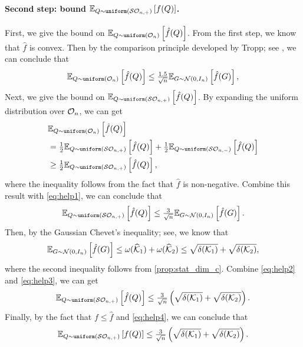 \paragraph{Second step: bound $\mathbb{E}_{Q \sim \operatorname{\texttt{uniform}}(\mathcal{S}\mathcal{O}_{n, +})}\left[f(Q)\right]$.} 
First, we give the bound on $\mathbb{E}_{Q \sim \operatorname{\texttt{uniform}}(\mathcal{O}_n)}\left[\hat f(Q)\right]$. From the first step, we know that $\hat f$ is convex. Then by the comparison principle developed by Tropp; see \cite[Theorem~5 and Lemma~8]{tropp2012comparison}, we can conclude that 
\begin{equation} \label{eq:help1}
  \mathbb{E}_{Q \sim \operatorname{\texttt{uniform}}(\mathcal{O}_n)}\left[\hat f(Q)\right] \leq \tfrac{1.5}{\sqrt{n}}\mathbb{E}_{G\sim\mathcal{N}(0, I_n)}\left[\hat f(G)\right],
\end{equation}
Next, we give the bound on $\mathbb{E}_{Q \sim \operatorname{\texttt{uniform}}(\mathcal{S}\mathcal{O}_{n, +})}\left[\hat f(Q)\right]$. By expanding the uniform distribution over $\mathcal{O}_n$, we can get
\begin{align*}
  &\mathbb{E}_{Q \sim \operatorname{\texttt{uniform}}(\mathcal{O}_n)}\left[\hat f(Q)\right] 
  \\&= \tfrac{1}{2}\mathbb{E}_{Q \sim \operatorname{\texttt{uniform}}(\mathcal{S}\mathcal{O}_{n, +})}\left[\hat f(Q)\right] + \tfrac{1}{2}\mathbb{E}_{Q \sim \operatorname{\texttt{uniform}}(\mathcal{S}\mathcal{O}_{n, -})}\left[\hat f(Q)\right]
  \\&\geq \tfrac{1}{2}\mathbb{E}_{Q \sim \operatorname{\texttt{uniform}}(\mathcal{S}\mathcal{O}_{n, +})}\left[\hat f(Q)\right],
\end{align*}
where the inequality follows from the fact that $\hat f$ is non-negative. Combine this result with \eqref{eq:help1}, we can conclude that 
\begin{equation} \label{eq:help2}
  \mathbb{E}_{Q \sim \operatorname{\texttt{uniform}}(\mathcal{S}\mathcal{O}_{n, +})}\left[\hat f(Q)\right] \leq \tfrac{3}{\sqrt{n}}\mathbb{E}_{G\sim\mathcal{N}(0, I_n)}\left[\hat f(G)\right].
\end{equation}
Then, by the Gaussian Chevet’s inequality; see\cite[Exercise~8.7.4]{vershynin2018high}, we know that 
\begin{equation} \label{eq:help3}
  \mathbb{E}_{G\sim\mathcal{N}(0, I_n)}\left[\hat f(G)\right] \leq \omega(\widehat{\mathcal{K}}_1) + \omega(\widehat{\mathcal{K}}_2) \leq \sqrt{\delta(\mathcal{K}_1)} + \sqrt{\delta(\mathcal{K}_2)},
\end{equation}
where the second inequality follows from \autoref{prop:stat_dim_c}. Combine \eqref{eq:help2} and \eqref{eq:help3}, we can get
\begin{equation} \label{eq:help4}
  \mathbb{E}_{Q \sim \operatorname{\texttt{uniform}}(\mathcal{S}\mathcal{O}_{n, +})}\left[\hat f(Q)\right] \leq \tfrac{3}{\sqrt{n}}\left( \sqrt{\delta(\mathcal{K}_1)} + \sqrt{\delta(\mathcal{K}_2)} \right).
\end{equation}
Finally, by the fact that $f \leq \hat f$ and \eqref{eq:help4}, we can conclude that 
\begin{equation} \label{eq:help5}
  \mathbb{E}_{Q \sim \operatorname{\texttt{uniform}}(\mathcal{S}\mathcal{O}_{n, +})}\left[f(Q)\right] \leq \tfrac{3}{\sqrt{n}}\left( \sqrt{\delta(\mathcal{K}_1)} + \sqrt{\delta(\mathcal{K}_2)} \right).
\end{equation}

